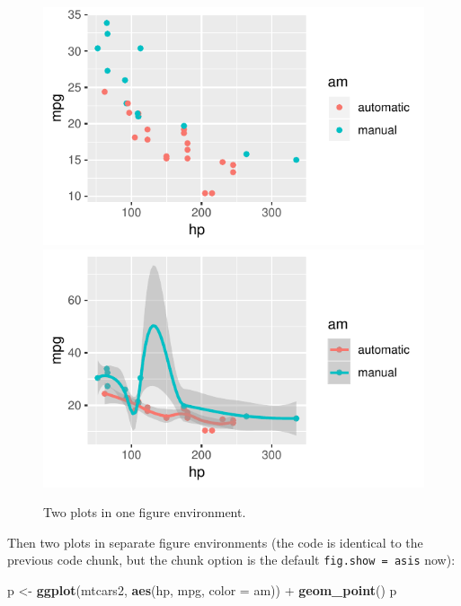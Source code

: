\documentclass[]{tufte-handout}
\newenvironment{Shaded}{}{}
\newcommand{\KeywordTok}[1]{\textcolor[rgb]{0.00,0.44,0.13}{\textbf{#1}}}
\newcommand{\DataTypeTok}[1]{\textcolor[rgb]{0.56,0.13,0.00}{#1}}
\newcommand{\StringTok}[1]{\textcolor[rgb]{0.25,0.44,0.63}{#1}}
\newcommand{\OperatorTok}[1]{\textcolor[rgb]{0.40,0.40,0.40}{#1}}
\newcommand{\NormalTok}[1]{#1}
\begin{document}
\begin{figure}
\includegraphics{TufteExample_files/figure-latex/fig-two-together-1} \includegraphics{TufteExample_files/figure-latex/fig-two-together-2} \caption[Two plots in one figure environment]{Two plots in one figure environment.}\label{fig:fig-two-together}
\end{figure}

Then two plots in separate figure environments (the code is identical to
the previous code chunk, but the chunk option is the default
\texttt{fig.show\ =\ \textquotesingle{}asis\textquotesingle{}} now):

\begin{Shaded}
\begin{Highlighting}[]
\NormalTok{p <-}\StringTok{ }\KeywordTok{ggplot}\NormalTok{(mtcars2, }\KeywordTok{aes}\NormalTok{(hp, mpg, }\DataTypeTok{color =}\NormalTok{ am)) }\OperatorTok{+}
\StringTok{  }\KeywordTok{geom_point}\NormalTok{()}
\NormalTok{p}
\end{Highlighting}
\end{Shaded}
\end{document}
